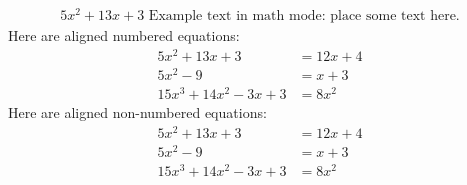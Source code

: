 \documentclass[11pt]{article} %
\begin{document}
\begin{align} %
    5x^2 + 13x + 3 \, \, \text{Example text in math mode: place some text here.}
\end{align}
    Here are aligned numbered equations:
\begin{align} %
    5x^2 + 13x + 3 &= 12x + 4\\
    5x^2 - 9 &= x + 3\\ %
    15x^3 + 14x^2 - 3x + 3 &= 8x^2
\end{align}
    Here are aligned non-numbered equations:
\begin{align*} %
    5x^2 + 13x + 3 &= 12x + 4\\
    5x^2 - 9 &= x + 3\\ %
    15x^3 + 14x^2 - 3x + 3 &= 8x^2
\end{align*}
\end{document}
